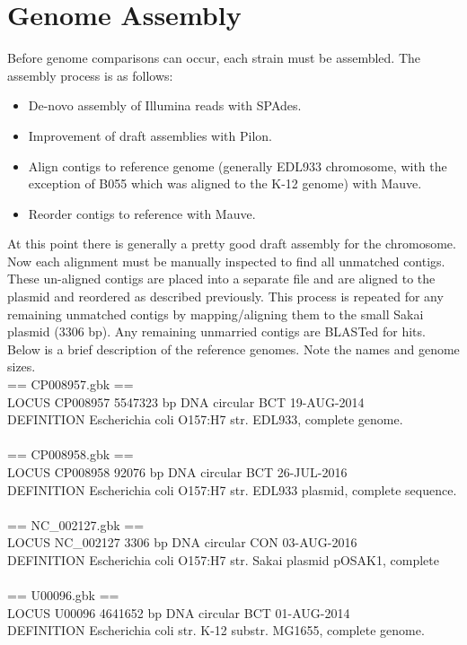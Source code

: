 \documentclass[11pt]{article}
\begin{document}
\section*{Genome Assembly}
Before genome comparisons can occur, each strain must be assembled. The assembly process is as follows: 

\begin{itemize}
\item De-novo assembly of Illumina reads with SPAdes.
\item Improvement of draft assemblies with Pilon.
\item Align contigs to reference genome (generally EDL933 chromosome, with the exception of B055 which was aligned to the K-12 genome) with Mauve.
\item Reorder contigs to reference with Mauve.
\end{itemize}

At this point there is generally a pretty good draft assembly for the chromosome. Now each alignment must be manually inspected to find all unmatched contigs. These un-aligned contigs are placed into a separate file and are aligned to the plasmid and reordered as described previously. This process is repeated for any remaining unmatched contigs by mapping/aligning them to the small Sakai plasmid (3306 bp). Any remaining unmarried contigs are BLASTed for hits. \\

Below is a brief description of the reference genomes. Note the names and genome sizes. \\

== CP008957.gbk ==   \\
LOCUS       CP008957             5547323 bp    DNA     circular BCT 19-AUG-2014 \\
DEFINITION  Escherichia coli O157:H7 str. EDL933, complete genome. \\
\\
== CP008958.gbk == \\
LOCUS       CP008958               92076 bp    DNA     circular BCT 26-JUL-2016   \\
DEFINITION  Escherichia coli O157:H7 str. EDL933 plasmid, complete sequence.   \\
 \\
== NC\_002127.gbk == \\
LOCUS       NC\_002127               3306 bp    DNA     circular CON 03-AUG-2016   \\
DEFINITION  Escherichia coli O157:H7 str. Sakai plasmid pOSAK1, complete   \\
 \\
== U00096.gbk == \\
LOCUS       U00096               4641652 bp    DNA     circular BCT 01-AUG-2014   \\
DEFINITION  Escherichia coli str. K-12 substr. MG1655, complete genome.   \\
\end{document}
